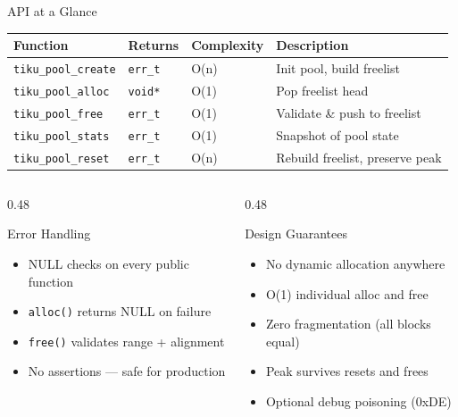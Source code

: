 \documentclass[aspectratio=169, 10pt]{beamer}
\begin{document}
\begin{frame}{API at a Glance}
\begin{table}
\centering
\small
\begin{tabular}{@{}llll@{}}
\toprule
\textbf{Function} & \textbf{Returns} & \textbf{Complexity} & \textbf{Description} \\
\midrule
\texttt{tiku\_pool\_create}  & \texttt{err\_t} & O(n) & Init pool, build freelist \\
\texttt{tiku\_pool\_alloc}   & \texttt{void*}  & O(1) & Pop freelist head \\
\texttt{tiku\_pool\_free}    & \texttt{err\_t} & O(1) & Validate \& push to freelist \\
\texttt{tiku\_pool\_stats}   & \texttt{err\_t} & O(1) & Snapshot of pool state \\
\texttt{tiku\_pool\_reset}   & \texttt{err\_t} & O(n) & Rebuild freelist, preserve peak \\
\bottomrule
\end{tabular}
\end{table}

\vspace{0.5em}
\begin{columns}[T]
\begin{column}{0.48\textwidth}
\begin{block}{Error Handling}
\begin{itemize}
  \item NULL checks on every public function
  \item \texttt{alloc()} returns NULL on failure
  \item \texttt{free()} validates range + alignment
  \item No assertions --- safe for production
\end{itemize}
\end{block}
\end{column}
\begin{column}{0.48\textwidth}
\begin{block}{Design Guarantees}
\begin{itemize}
  \item No dynamic allocation anywhere
  \item O(1) individual alloc and free
  \item Zero fragmentation (all blocks equal)
  \item Peak survives resets and frees
  \item Optional debug poisoning (0xDE)
\end{itemize}
\end{block}
\end{column}
\end{columns}
\end{frame}
\end{document}
